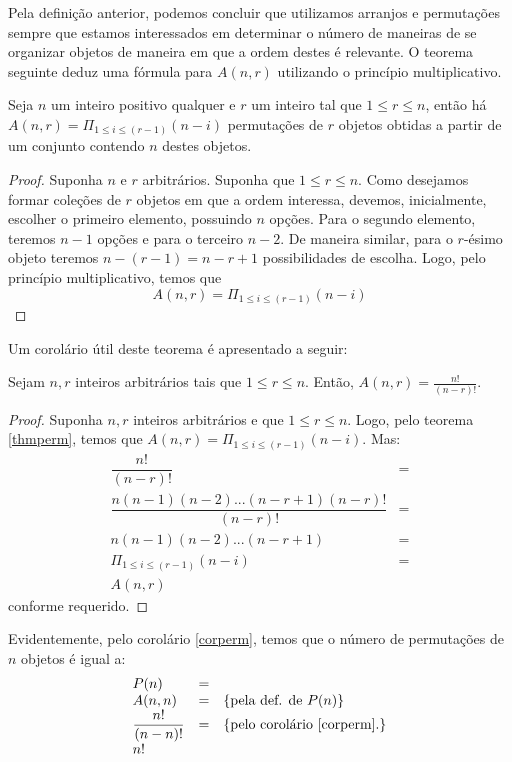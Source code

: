 Pela definição anterior, podemos concluir que utilizamos arranjos e
permutações sempre que estamos interessados em determinar o número de
maneiras de se organizar objetos de maneira em que a ordem destes é
relevante. O teorema seguinte deduz uma fórmula para $A(n,r)$
utilizando o princípio multiplicativo.

\begin{Theorem}\label{thmperm}
Seja $n$ um inteiro positivo qualquer e $r$ um inteiro tal que $1 \leq
r \leq n$, então há $A(n,r) = \Pi_{1 \leq i \leq (r - 1)}(n - i)$
permutações de $r$ objetos obtidas a partir de um conjunto contendo
$n$ destes objetos.
\end{Theorem}
\begin{proof}
Suponha $n$ e $r$ arbitrários. Suponha que $1 \leq r \leq n$. Como
desejamos formar coleções de $r$ objetos em que a ordem interessa,
devemos, inicialmente, escolher o primeiro elemento, possuindo $n$
opções. Para o segundo elemento, teremos $n -1$ opções e para o
terceiro $n- 2$. De maneira similar, para o $r$-ésimo objeto teremos
$n - (r - 1) = n -r + 1$ possibilidades de escolha. Logo, pelo
princípio multiplicativo, temos que
\[
    A(n,r) = \displaystyle{\Pi_{1 \leq i \leq (r - 1)}(n - i)}
\]
\end{proof}

Um corolário útil deste teorema é apresentado a seguir:

\begin{Corollary}\label{corperm}
Sejam $n,r$ inteiros arbitrários tais que $1 \leq r \leq n$. Então,
$A(n,r) = \frac{n!}{(n - r)!}$.
\end{Corollary}
\begin{proof}
Suponha $n,r$ inteiros arbitrários e que $1 \leq r \leq n$. Logo, pelo
teorema \ref{thmperm}, temos que $A(n,r) = \Pi_{1 \leq i \leq (r -
  1)}(n - i)$. Mas:
\[
\begin{array}{lc}
\dfrac{n!}{(n - r)!} & = \\
\dfrac{n(n-1)(n-2) ... (n- r + 1) (n - r)!}{(n - r)!} & = \\
n(n - 1)(n-2) ... (n - r + 1) & = \\
\Pi_{1 \leq i \leq (r - 1)}(n - i) & = \\
A(n,r)
\end{array}
\]
conforme requerido.
\end{proof}
Evidentemente, pelo corolário \ref{corperm}, temos que o número de
permutações de $n$ objetos é igual a:
\[
\begin{array}{lcl}
P(n) & = &\\
A(n,n) & = &\{\text{pela def. de }P(n)\}\\
\dfrac{n!}{(n - n)!} & = & \{\text{pelo corolário \ref{corperm}.}\}\\
n!
\end{array}
\]

